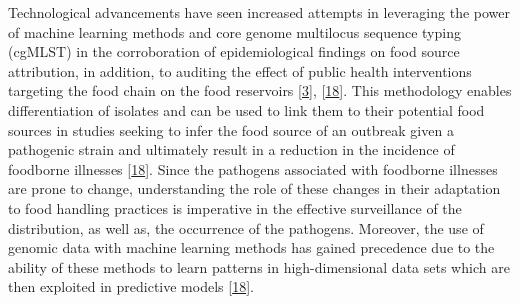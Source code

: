 \documentclass[
  10pt,
]{article}
\begin{document}
Technological advancements have seen increased attempts in leveraging the power of machine learning methods and core genome multilocus sequence typing (cgMLST) in the corroboration of epidemiological findings on food source attribution, in addition, to auditing the effect of public health interventions targeting the food chain on the food reservoirs {[}\protect\hyperlink{ref-tanui2022machine}{3}{]}, {[}\protect\hyperlink{ref-Munck2020}{18}{]}. This methodology enables differentiation of isolates and can be used to link them to their potential food sources in studies seeking to infer the food source of an outbreak given a pathogenic strain and ultimately result in a reduction in the incidence of foodborne illnesses {[}\protect\hyperlink{ref-Munck2020}{18}{]}. Since the pathogens associated with foodborne illnesses are prone to change, understanding the role of these changes in their adaptation to food handling practices is imperative in the effective surveillance of the distribution, as well as, the occurrence of the pathogens. Moreover, the use of genomic data with machine learning methods has gained precedence due to the ability of these methods to learn patterns in high-dimensional data sets which are then exploited in predictive models {[}\protect\hyperlink{ref-Munck2020}{18}{]}.
\end{document}
